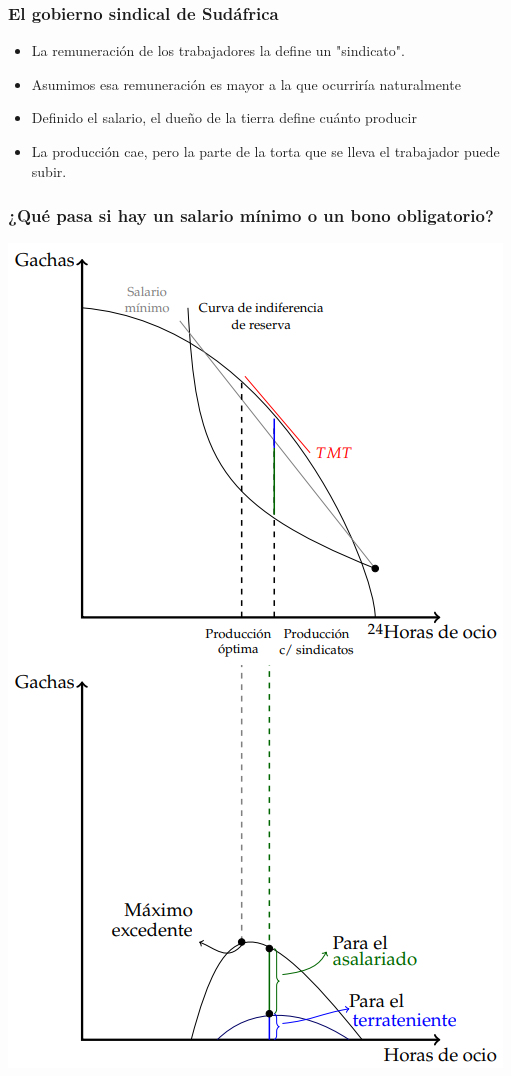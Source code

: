 \documentclass{beamer}
\begin{document}
\begin{frame}
\frametitle{El gobierno sindical de Sudáfrica}
\begin{itemize}
    \item La remuneración de los trabajadores la define un "sindicato". 
    \item  Asumimos esa remuneración es mayor a la que ocurriría naturalmente
    \item Definido el salario, el dueño de la tierra define cuánto producir
    \item  La producción cae, pero la parte de la torta que se lleva el trabajador puede subir. 
\end{itemize}
\end{frame}

\begin{frame}
\frametitle{¿Qué pasa si hay un salario mínimo o un bono obligatorio?}
\centering
\includegraphics[scale=0.29]{../Figures/C19.19.png}
\end{frame}
\end{document}
